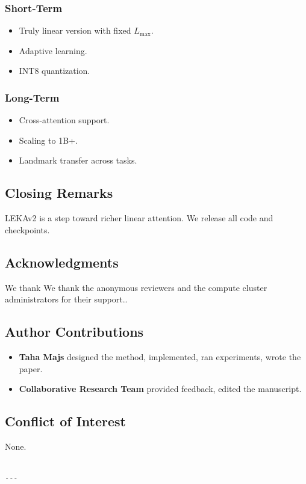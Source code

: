 \subsubsection{Short-Term}
\begin{itemize}
\item Truly linear version with fixed $L_\text{max}$.
\item Adaptive   learning.
\item INT8 quantization.

\end{itemize}
\subsubsection{Long-Term}
\begin{itemize}
\item Cross-attention support.
\item Scaling to 1B+.
\item Landmark transfer across tasks.

\end{itemize}
\subsection{Closing Remarks}

LEKAv2 is a step toward richer linear attention. We release all code and 
checkpoints.

\subsection{Acknowledgments}

We thank We thank the anonymous reviewers and the compute cluster administrators for their support..

\subsection{Author Contributions}

\begin{itemize}
\item \textbf{Taha Majs} designed the method, implemented, ran experiments,
  wrote the paper.
\item \textbf{Collaborative Research Team} provided feedback, edited the manuscript.

\end{itemize}
\subsection{Conflict of Interest}

None.
\begin{lstlisting}

---
\end{lstlisting}